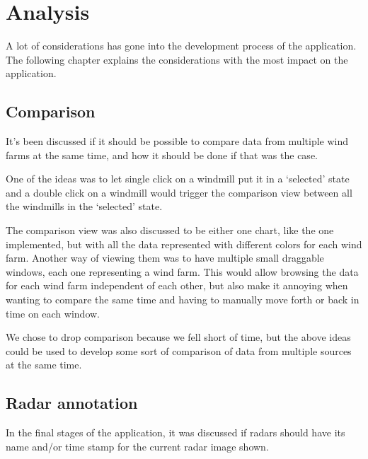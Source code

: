 \chapter{Analysis}
A lot of considerations has gone into the development process of the application. The following chapter explains the considerations with the most impact on the application.

\section{Comparison}
It's been discussed if it should be possible to compare data from multiple wind farms at the same time, and how it should be done if that was the case.

One of the ideas was to let single click on a windmill put it in a `selected' state and a double click on a windmill would trigger the comparison view between all the windmills in the `selected' state.

The comparison view was also discussed to be either one chart, like the one implemented, but with all the data represented with different colors for each wind farm.
Another way of viewing them was to have multiple small draggable windows, each one representing a wind farm. This would allow browsing the data for each wind farm independent of each other, but also make it annoying when wanting to compare the same time and having to manually move forth or back in time on each window.

We chose to drop comparison because we fell short of time, but the above ideas could be used to develop some sort of comparison of data from multiple sources at the same time.

\section{Radar annotation}
In the final stages of the application, it was discussed if radars should have its name and/or time stamp for the current radar image shown.

